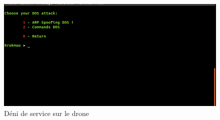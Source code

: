 \begin{figure}[H]
  \centering
  \includegraphics[scale=0.5]{images/dos}
  \caption{Déni de service sur le drone}
\end{figure}
